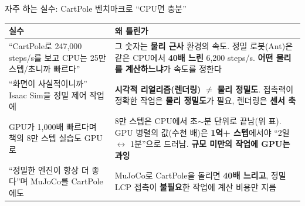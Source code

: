 \documentclass[aspectratio=169,11pt]{beamer}
\begin{document}

\begin{frame}{자주 하는 실수: CartPole 벤치마크로 ``CPU면 충분''}
  \small
  \begin{tabular}{@{}p{4.8cm}p{9.2cm}@{}}
    \toprule
    실수 & 왜 틀린가 \\
    \midrule
    ``CartPole로 247,000 steps/s를 보고 CPU는 25만 스텝/초니까
      빠르다'' & 그 숫자는 \textbf{물리 근사} 환경의 속도. 정밀
      로봇(Ant)은 같은 CPU에서 \textbf{40배 느린} 6,200 steps/s.
      \textbf{어떤 물리를 계산하느냐}가 속도를 정한다 \\
    ``화면이 사실적이니까'' Isaac Sim을 정밀 제어 작업에 &
      \textbf{시각적 리얼리즘(렌더링)} $\neq$ \textbf{물리
      정밀도}. 접촉력이 정확한 작업은 \textbf{물리 정밀도}가
      필요, 렌더링은 \textbf{센서 축} \\
    GPU가 1,000배 빠르다며 책의 8만 스텝 실습도 GPU로 & 8만
      스텝은 CPU에서 초$\sim$분 단위로 끝남(위 표). GPU 병렬의
      값(수천 배)은 \textbf{1억+ 스텝}에서야 ``2일 $\leftrightarrow$
      1분''으로 드러남. \textbf{규모 미만의 작업에 GPU는 과잉} \\
    ``정밀한 엔진이 항상 더 좋다''며 MuJoCo를 CartPole에도 &
      MuJoCo로 CartPole을 돌리면 \textbf{40배 느리고}, 정밀 LCP
      접촉이 \textbf{불필요}한 작업에 계산 비용만 지름 \\
    \bottomrule
  \end{tabular}
\end{frame}
\end{document}
